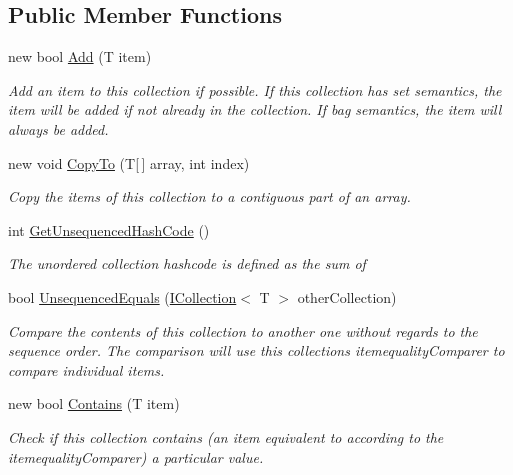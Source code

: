 \subsection*{Public Member Functions}
\begin{DoxyCompactItemize}
\item 
new bool \hyperlink{interface_c5_1_1_i_collection_a525115f252ddca586fcbf1a0127be614}{Add} (T item)
\begin{DoxyCompactList}\small\item\em Add an item to this collection if possible. If this collection has set semantics, the item will be added if not already in the collection. If bag semantics, the item will always be added. \end{DoxyCompactList}\item 
new void \hyperlink{interface_c5_1_1_i_collection_aa2f928b7057eb84a1572307123e8239e}{Copy\+To} (T\mbox{[}$\,$\mbox{]} array, int index)
\begin{DoxyCompactList}\small\item\em Copy the items of this collection to a contiguous part of an array. \end{DoxyCompactList}\item 
int \hyperlink{interface_c5_1_1_i_collection_ae3a4fa01c3b09b9b372bb6f8639194ed}{Get\+Unsequenced\+Hash\+Code} ()
\begin{DoxyCompactList}\small\item\em The unordered collection hashcode is defined as the sum of \end{DoxyCompactList}\item 
bool \hyperlink{interface_c5_1_1_i_collection_a46fee76e3afed2b0510e94814ef832b2}{Unsequenced\+Equals} (\hyperlink{interface_c5_1_1_i_collection}{I\+Collection}$<$ T $>$ other\+Collection)
\begin{DoxyCompactList}\small\item\em Compare the contents of this collection to another one without regards to the sequence order. The comparison will use this collection\textquotesingle{}s itemequality\+Comparer to compare individual items. \end{DoxyCompactList}\item 
new bool \hyperlink{interface_c5_1_1_i_collection_a4de01b6d77ea5eaffccc8267b4454cdd}{Contains} (T item)
\begin{DoxyCompactList}\small\item\em Check if this collection contains (an item equivalent to according to the itemequality\+Comparer) a particular value. \end{DoxyCompactList}\item 

\end{DoxyCompactItemize}
